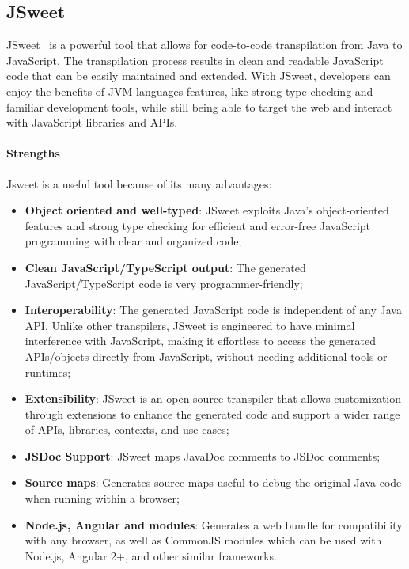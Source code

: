 \subsection{JSweet}
\label{ssec:jsweet}
JSweet~\cite{JSweetat88:online} is a powerful tool that allows for code-to-code transpilation from Java to JavaScript. The transpilation process results in clean and readable JavaScript code that can be easily maintained and extended. With JSweet, developers can enjoy the benefits of JVM languages features, like strong type checking and familiar development tools, while still being able to target the web and interact with JavaScript libraries and APIs.
\paragraph{Strengths} Jsweet is a useful tool because of its many advantages:
\begin{itemize}
	\item\textbf{Object oriented and well-typed}: JSweet exploits Java's object-oriented features and strong type checking for efficient and error-free JavaScript programming with clear and organized code;
	\item \textbf{Clean JavaScript/TypeScript output}: The generated JavaScript/TypeScript code is very programmer-friendly;
	\item \textbf{Interoperability}: The generated JavaScript code is independent of any Java API. Unlike other transpilers, JSweet is engineered to have minimal interference with JavaScript, making it effortless to access the generated APIs/objects directly from JavaScript, without needing additional tools or runtimes;
	\item \textbf{Extensibility}: JSweet is an open-source transpiler that allows customization through extensions to enhance the generated code and support a wider range of APIs, libraries, contexts, and use cases;
	\item \textbf{JSDoc Support}: JSweet maps JavaDoc comments to JSDoc comments;
	\item \textbf{Source maps}: Generates source maps useful to debug the original Java code when running within a browser;
	\item \textbf{Node.js, Angular and modules}: Generates a web bundle for compatibility with any browser, as well as CommonJS modules which can be used with Node.js, Angular 2+, and other similar frameworks.
\end{itemize}

